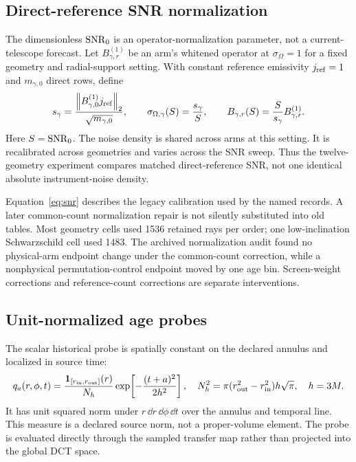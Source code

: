 \subsection{Direct-reference SNR normalization}\label{sec:snr}
The dimensionless $\mathrm{SNR}_0$ is an operator-normalization parameter, not a current-telescope forecast. Let $B_{\gamma,r}^{(1)}$ be an arm's whitened operator at $\sigma_\Omega=1$ for a fixed geometry and radial-support setting. With constant reference emissivity $j_{\rm ref}=1$ and $m_{\gamma,0}$ direct rows, define
\begin{equation}
s_\gamma=\frac{\left\lVert B_{\gamma,0}^{(1)}j_{\rm ref}\right\rVert_2}{\sqrt{m_{\gamma,0}}},
\qquad \sigma_{\Omega,\gamma}(S)=\frac{s_\gamma}{S},
\qquad B_{\gamma,r}(S)=\frac{S}{s_\gamma}B_{\gamma,r}^{(1)}.
\label{eq:snr}
\end{equation}
Here $S=\mathrm{SNR}_0$. The noise density is shared across arms at this setting. It is recalibrated across geometries and varies across the SNR sweep. Thus the twelve-geometry experiment compares matched direct-reference SNR, not one identical absolute instrument-noise density.

Equation~\eqref{eq:snr} describes the legacy calibration used by the named records. A later common-count normalization repair is not silently substituted into old tables. Most geometry cells used 1536 retained rays per order; one low-inclination Schwarzschild cell used 1483. The archived normalization audit found no physical-arm endpoint change under the common-count correction, while a nonphysical permutation-control endpoint moved by one age bin. Screen-weight corrections and reference-count corrections are separate interventions.

\subsection{Unit-normalized age probes}
The scalar historical probe is spatially constant on the declared annulus and localized in source time:
\begin{equation}
q_a(r,\phi,t)=\frac{\mathbf1_{[r_{\rm in},r_{\rm out}]}(r)}{N_h}
\exp\!\left[-\frac{(t+a)^2}{2h^2}\right],\quad
N_h^2=\pi(r_{\rm out}^2-r_{\rm in}^2)h\sqrt\pi,\quad h=3M.
\label{eq:probe}
\end{equation}
It has unit squared norm under $r\,\dd r\,\dd\phi\,\dd t$ over the annulus and temporal line. This measure is a declared source norm, not a proper-volume element. The probe is evaluated directly through the sampled transfer map rather than projected into the global DCT space.

